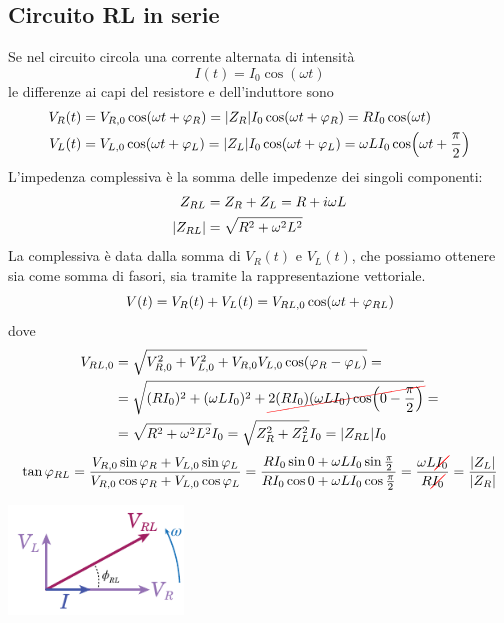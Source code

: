 \subsection{Circuito RL in serie}
	\begin{center}		
\end{center}
Se nel circuito circola una corrente alternata di intensità
\begin{equation*}
	I(t)=I_0\cos(\omega t)
\end{equation*}
le differenze ai capi del resistore e dell'induttore sono
\begin{align*}
	V_R(t)&=V_{R,0}\cos(\omega t +\oldphi_R)=\abs{Z_R}I_0\cos(\omega t +\oldphi_R)=RI_0\cos(\omega t)
	\\
	V_L(t)&=V_{L,0}\cos(\omega t +\oldphi_L)=\abs{Z_L}I_0\cos(\omega t +\oldphi_L)=\omega LI_0\cos(\omega t +\frac{\pi}{2})
\end{align*}
L'impedenza complessiva è la somma delle impedenze dei singoli componenti:
\begin{align}
	Z_{RL}&=Z_R+Z_L=R+i\omega L\\
	\abs{Z_{RL}}&=\sqrt{R^2+\omega^2L^2}
\end{align}
La \ddp complessiva è data dalla somma di $V_R(t)$ e $V_L(t)$, che possiamo ottenere sia come somma di fasori, sia tramite la rappresentazione vettoriale.
\begin{equation*}
	V(t)=V_R(t)+V_L(t)=V_{RL,0}\cos(\omega t+\oldphi_{RL})
\end{equation*}
dove
\begin{align*}
	V_{RL,0}&=\sqrt{V_{R,0}^2+V_{L,0}^2+V_{R,0}V_{L,0}\cos(\oldphi_R-\oldphi_L)}=\\
	&=\sqrt{(RI_0)^2+(\omega LI_0)^2+\Ccancel[red]{2(RI_0)(\omega LI_0)\cos(0-\frac{\pi}{2})}}=\\
	&=\sqrt{R^2+\omega^2L^2}I_0=\sqrt{Z_R^2+Z_L^2}I_0=\abs{Z_{RL}}I_0
\end{align*}
\begin{equation*}
	\tan\oldphi_{RL}=\frac{V_{R,0}\sin\oldphi_R+V_{L,0}\sin\oldphi_L}{V_{R,0}\cos\oldphi_R+V_{L,0}\cos\oldphi_L}=\frac{RI_0\sin0+\omega LI_0\sin\frac{\pi}{2}}{RI_0\cos0+\omega LI_0\cos\frac{\pi}{2}}=\frac{\omega L\Ccancel[red]{I_0}}{R\Ccancel[red]{I_0}}=\frac{\abs{Z_L}}{\abs{Z_R}}
\end{equation*}
\begin{center}
	\includegraphics[width=0.35\textwidth]{images/chp11/chp11fasoriRL.pdf}
\end{center}
